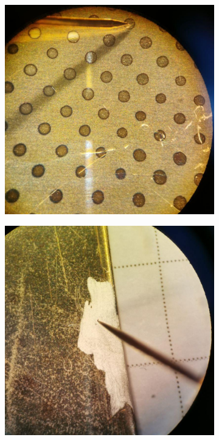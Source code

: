 \begin{figure}[htb]
	\centering
	\begin{subfigure}{0.49\textwidth}
		\centering
		\includegraphics[width=.8\textwidth]{Pics/micro-1.png}
		\caption{}
		\label{fig:micro1}
	\end{subfigure}
	\begin{subfigure}{0.49\textwidth}
		\centering
		\includegraphics[width=.8\textwidth]{Pics/micro-2.png}
		\caption{}
		\label{fig:micro2}
	\end{subfigure}
	\begin{subfigure}{\textwidth}
		\centering

\end{subfigure}
\end{figure}

